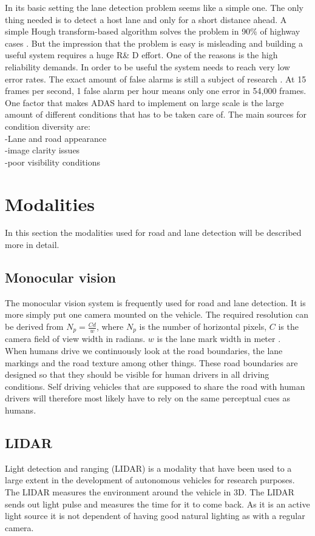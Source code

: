 In its basic setting the lane detection problem seems like a simple one. The only thing needed is to detect a host lane and only for a short distance ahead. A simple Hough transform-based algorithm solves the problem in 90\% of highway cases \cite{BarHillel2014}. 
But the impression that the problem is easy is misleading and building a useful system requires a huge R\& D effort. One of the reasons is the high reliability demands. In order to be useful the system needs to reach very low error rates. The exact amount of false alarms is still a subject of research \cite{BarHillel2014}.
At 15 frames per second, 1 false alarm per hour means only one error in 54,000 frames.\\


One factor that makes ADAS hard to implement on large scale is the large amount of different conditions that has to be taken care of. The main sources for condition diversity are:\\
-Lane and road appearance\\
-image clarity issues\\
-poor visibility conditions\\

\section{Modalities}
In this section the modalities used for road and lane detection will be described more in detail.

\subsection{Monocular vision}
The monocular vision system is frequently used for road and lane detection. It is more simply put one camera mounted on the vehicle. The required resolution can be derived from $N_p = \frac{Cd}{w}$, where $N_p$ is the number of horizontal pixels, $C$ is the camera field of view width in radians. $w$ is the lane mark width in meter \cite{BarHillel2014}.\\
When humans drive we continuously look at the road boundaries, the lane markings and the road texture among other things. These road boundaries are designed so that they should be visible for human drivers in all driving conditions. Self driving vehicles that are supposed to share the road with human drivers will therefore most likely have to rely on the same perceptual cues as humans.

\subsection{LIDAR}
Light detection and ranging (LIDAR) is a modality that have been used to a large extent in the development of autonomous vehicles for research purposes. The LIDAR measures the environment around the vehicle in 3D. The LIDAR sends out light pulse and measures the time for it to come back. As it is an active light source it is not dependent of having good natural lighting as with a regular camera. \\

